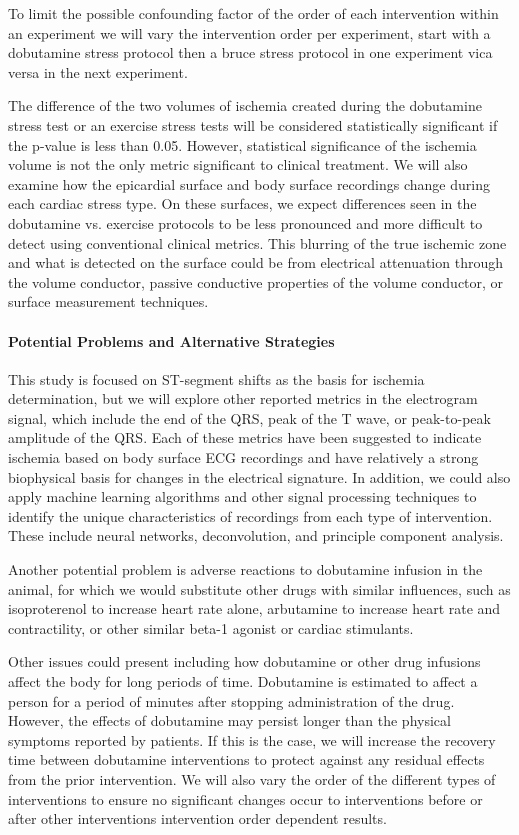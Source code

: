 To limit the possible confounding factor of the order of each intervention within an experiment we will vary the intervention order per experiment, \ie{} start with a dobutamine stress protocol then a bruce stress protocol in one experiment vica versa in the next experiment. 


The difference of the two volumes of ischemia created during the dobutamine stress test or an exercise stress tests will be considered statistically significant if the p-value is less than 0.05. However, statistical significance of the ischemia volume is not the only metric significant to clinical treatment. We will also examine how the epicardial surface and body surface recordings change during each cardiac stress type. On these surfaces, we expect differences seen in the dobutamine vs. exercise protocols to be less pronounced and more difficult to detect using conventional clinical metrics. This blurring of the true ischemic zone and what is detected on the surface could be from electrical attenuation through the volume conductor, passive conductive properties of the volume conductor, or surface measurement techniques. 

 


\paragraph{Potential Problems and Alternative Strategies} This study is
focused on ST-segment shifts as the basis for ischemia determination, but
we will explore other reported metrics in the electrogram signal, which
include the end of the QRS, peak of the T wave, or peak-to-peak amplitude
of the QRS. Each of these metrics have been suggested to indicate ischemia based on body surface ECG recordings and have relatively a strong biophysical basis for changes in the electrical signature. In addition, we could also apply machine learning algorithms and other signal processing techniques to identify the unique characteristics of recordings from each type of intervention. These include neural networks, deconvolution, and principle component analysis. 

Another potential problem is adverse reactions to dobutamine
infusion in the animal, for which we would substitute other drugs with
similar influences, such as isoproterenol to increase heart rate alone,
arbutamine to increase heart rate and contractility, or other similar
beta-1 agonist or cardiac stimulants. 



Other issues could present including how dobutamine or other drug infusions affect the body for long periods of time. Dobutamine is estimated to affect a person for a period of minutes after stopping administration of the drug. However, the effects of dobutamine may persist longer than the physical symptoms reported by patients. If this is the case, we will increase the recovery time between dobutamine interventions to protect against any residual effects from the prior intervention. We will also vary the order of the different types of interventions to ensure no significant changes occur to interventions before or after other interventions \ie{} intervention order dependent results. 




